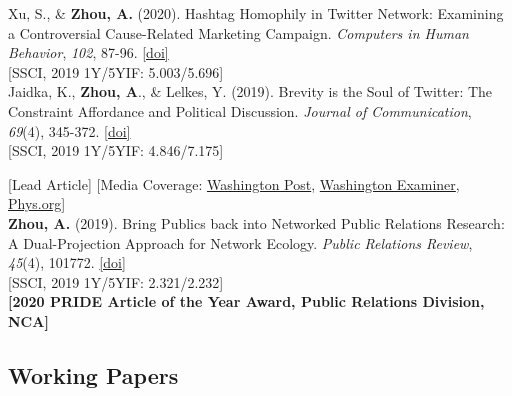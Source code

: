 \documentclass[12pt, letterpaper]{article}
\newcommand{\doi}[1]{\href{#1}{{[doi]}}}
\newcommand{\years}[1]{\marginnote{\normalsize #1}}
\begin{document}
  \years{[3]} Xu, S., \& \textbf{Zhou, A.} (2020). Hashtag Homophily in Twitter Network: Examining a Controversial Cause-Related Marketing Campaign. \textit{Computers in Human Behavior}, \textit{102}, 87-96. \doi{https://doi.org/10.1016/j.chb.2019.08.006}\\
  \years{} {[SSCI, 2019 1Y/5YIF: 5.003/5.696]}\\
  \years{[2]} Jaidka, K., \textbf{Zhou, A}., \& Lelkes, Y. (2019). Brevity is the Soul of Twitter: The Constraint Affordance and Political Discussion. \textit{Journal of Communication}, \textit{69}(4), 345-372. \doi{https://doi.org/10.1093/joc/jqz023}\\
  \years{} {[SSCI, 2019 1Y/5YIF: 4.846/7.175]}\\
  \years{} {[Lead Article] [Media Coverage: \href{https://www.washingtonpost.com/politics/2019/09/17/twitter-got-somewhat-more-civil-when-tweets-doubled-length-heres-how-we-know}{Washington Post}, \href{https://www.washingtonexaminer.com/opinion/twitter-conversations-have-improved-but-theres-a-better-way-to-talk-to-each-other}{Washington Examiner}, \href{https://phys.org/news/2019-09-character-limit-twitter-civil.html}{Phys.org}]\\
  \years{[1]} \textbf{Zhou, A.} (2019). Bring Publics back into Networked Public Relations Research: A Dual-Projection Approach for Network Ecology. \textit{Public Relations Review}, \textit{45}(4), 101772. \doi{https://doi.org/10.1016/j.pubrev.2019.03.004}\\
  \years{} {[SSCI, 2019 1Y/5YIF: 2.321/2.232]}\\
  \years{} {\textbf{[2020 PRIDE Article of the Year Award, Public Relations Division, NCA]}}

\subsection*{Working Papers}

}
\end{document}
